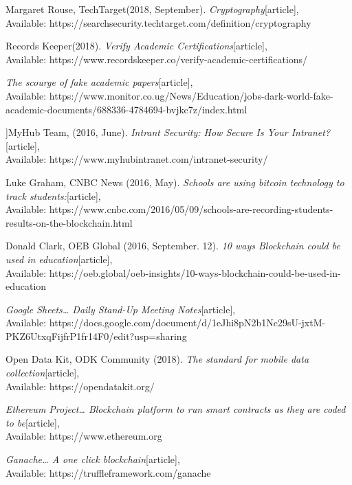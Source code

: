 \begin{thebibliography}{10}

Margaret Rouse, TechTarget(2018, September).
\emph{Cryptography}[article],\\
Available: {https://searchsecurity.techtarget.com/definition/cryptography}

 Records Keeper(2018).
\emph{Verify Academic Certifications}[article],\\
Available: {https://www.recordskeeper.co/verify-academic-certifications/}

\emph{The scourge of fake academic papers}[article],\\
Available: {https://www.monitor.co.ug/News/Education/jobs-dark-world-fake-academic-documents/688336-4784694-bvjkc7z/index.html}

]MyHub Team, (2016, June).
\emph{Intrant Security: How Secure Is Your Intranet?}[article],\\
Available: {https://www.myhubintranet.com/intranet-security/}

Luke Graham, CNBC News (2016, May).
\emph{Schools are using bitcoin technology to track students:}[article],\\
Available: {https://www.cnbc.com/2016/05/09/schools-are-recording-students-results-on-the-blockchain.html}

Donald Clark, OEB Global (2016, September. 12).
\emph{10 ways Blockchain could be used in education}[article],\\
Available: {https://oeb.global/oeb-insights/10-ways-blockchain-could-be-used-in-education}

\emph{Google Sheets… Daily Stand-Up Meeting Notes}[article],\\
Available: {https://docs.google.com/document/d/1eJhi8pN2b1Nc29sU-jxtM-PKZ6UtxqFijfrP1fr14F0/edit?usp=sharing}

 Open Data Kit, ODK Community (2018).
\emph{The standard for mobile data collection}[article],\\
Available: {https://opendatakit.org/}


\emph{Ethereum Project… Blockchain platform to run smart contracts as they are coded to be}[article],\\
Available: {https://www.ethereum.org}

\emph{Ganache… A one click blockchain}[article],\\
Available: {https://truffleframework.com/ganache}


\end{thebibliography}

\newpage